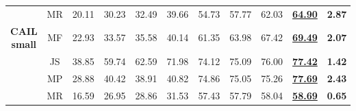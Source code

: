 \begin{table}[htbp]
\begin{tabular}{@{}c|c|cccc|cc|c|c|c@{}}
                                          & MR                                & 20.11                    & 30.23                    & 32.49                   & 39.66                   & 54.73                                                     & 57.77                                                    & 62.03                                                                                      & \underline{\textbf{64.90}}                                                                & \textbf{2.87}                     \\
        \textbf{CAIL small}               & MF                               & 22.93                    & 33.57                    & 35.58                   & 40.14                   & 61.35                                                     & 63.98                                                    & 67.42                                                                                      & \underline{\textbf{69.49}}                                                                & \textbf{2.07}                     \\
                                          & JS                                & 38.85                    & 59.74                    & 62.59                   & 71.98                   & 74.12                                                     & 75.09                                                    & 76.00                                                                                      & \underline{\textbf{77.42}}                                                                & \textbf{1.42}                     \\
                                          & MP                                & 28.88                    & 40.42                    & 38.91                   & 40.82                   & 74.86                                                     & 75.05                                                    & 75.26                                                                                     & \underline{\textbf{77.69}}                                                                & \textbf{2.43}                     \\
                                          & MR                                & 16.59                    & 26.95                    & 28.86                   & 31.53                   & 57.43                                                     & 57.79                                                    & 58.04                                                                                      & \underline{\textbf{58.69}}                                                                & \textbf{0.65}                     \\

\end{tabular}
\end{table}

